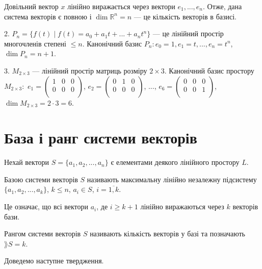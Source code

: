 \begin{example}
	Довільний вектор $x$ лінійно виражається через вектори $e_1, ..., e_n$. Отже, дана
	система векторів є повною і $\dim \mathbb{R}^n = n$ --- це кількість векторів в базисі.

	2. $P_n = \{f(t) \mid f(t) = a_0 + a_1t + ... + a_nt^n\}$ --- це лінійний простір многочленів
	степені $\leqslant n$. Канонічний базис $P_n: e_0=1, e_1=t, ..., e_n=t^n$, $\dim P_n = n+1$.

	3. $M_{2 \times 3}$ --- лінійний простір матриць розміру $2 \times 3$. Канонічний базис простору	
	$M_{2 \times 3}:$
	$e_1 = \begin{pmatrix}
		1 & 0 & 0 \\
		0 & 0 & 0 \\
	\end{pmatrix}$, $e_2 = \begin{pmatrix}
		0 & 1 & 0 \\
		0 & 0 & 0 \\
	\end{pmatrix}$, ..., $e_6 = \begin{pmatrix}
		0 & 0 & 0 \\
		0 & 0 & 1 \\
	\end{pmatrix}$, $\dim M_{2 \times 3} = 2 \cdot 3 = 6$.
\end{example}

\section{База і ранг системи векторів}  %

Нехай вектори $S = \{a_1, a_2, ..., a_n\}$ є елементами деякого лінійного простору $L$.

\begin{definition}
	Базою системи векторів $S$ називають максимальну лінійно незалежну
	підсистему $\{a_1, a_2, ..., a_k\}$, $k \leqslant n$, $a_i \in S$, $i = \overline{1,k}$.
\end{definition}

Це означає, що всі вектори $a_i$, де $i \geqslant k+1$ лінійно виражаються через $k$
векторів бази.

\begin{definition}
	Рангом системи векторів $S$ називають кількість векторів у базі та
	позначають $\rang S = k$.
\end{definition}

Доведемо наступне твердження.


